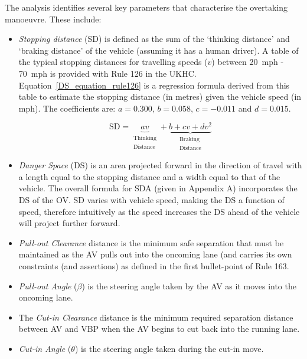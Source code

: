 The analysis identifies several key parameters that characterise the overtaking manoeuvre. These include:
\begin{itemize}
    \item \emph{Stopping distance} (SD) is defined as the sum of the `thinking distance' and `braking distance' of the vehicle (assuming it has a human driver). %
    A table of the typical stopping distances for travelling speeds ($v$) between 20~mph - 70~mph is provided with Rule 126 in the UKHC.
    Equation~\ref{DS_equation_rule126} is a regression formula derived from this table to estimate the stopping distance (in metres) 
     given the vehicle speed (in mph).
    The coefficients are: $a=0.300$, $b=0.058$, $c=-0.011$ and $d=0.015$.
    
\begin{equation} 
\label{DS_equation_rule126}
\text{SD} = \underbrace{av }_{\substack{\text{Thinking} \\ \text{Distance}}} + \underbrace{b + cv + dv^2}_{\substack{\text{Braking} \\ \text{Distance}}}
\end{equation}

    \item \emph{Danger Space} (DS) is an area projected forward in the direction of travel with a length equal to the stopping distance and a width equal to that of the vehicle. The overall formula for SDA (given in Appendix A) incorporates the DS of the OV.
    SD varies with vehicle speed, making the DS a function of speed, therefore intuitively as the speed increases the DS ahead of the vehicle will project further forward.
    
    \item \emph{Pull-out Clearance} distance is the minimum safe separation that must be maintained as the AV pulls out into the oncoming lane (and carries its own constraints (and assertions) as defined in the first bullet-point of Rule 163.%
    
    \item \emph{Pull-out Angle} ($\beta$) is the steering angle taken by the AV as it moves into the oncoming lane.
    
    \item The \emph{Cut-in Clearance} distance is the minimum required separation distance between AV and VBP when the AV begins to cut back into the running lane.
    
    \item \emph{Cut-in Angle} ($\theta$) is the steering angle taken during the cut-in move.
\end{itemize}

